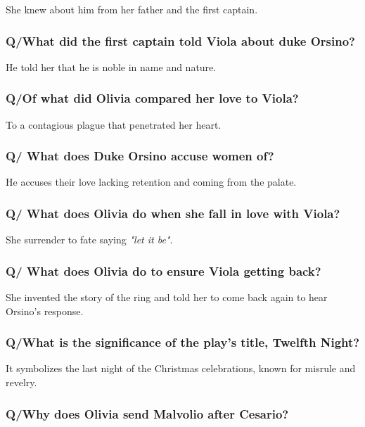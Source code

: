 \documentclass[12pt, a4paper]{article}
\begin{document}
She knew about him from her father and the first captain.

\subsubsection*{Q/What did the first captain told Viola about duke Orsino?}

He told her that he is noble in name and nature.

\subsubsection*{Q/Of what did Olivia compared her love to Viola?}

To a contagious plague that penetrated her heart.

\subsubsection*{Q/ What does Duke Orsino accuse women of?}

He accuses their love lacking retention and coming from the palate.

\subsubsection*{Q/ What does Olivia do when she fall in love with Viola?}

She surrender to fate saying \textit{"let it be"}.

\subsubsection*{Q/ What does Olivia do to ensure Viola getting back?}

She invented the story of the ring and told her to come back again to hear
Orsino's response.

\subsubsection*{Q/What is the significance of the play’s title, Twelfth Night?}

It symbolizes the last night of the Christmas celebrations, known for misrule and revelry.

\subsubsection*{Q/Why does Olivia send Malvolio after Cesario?}
\end{document}
